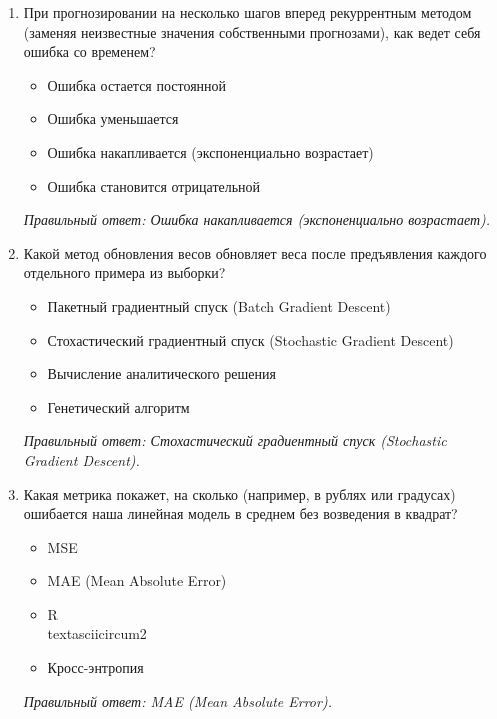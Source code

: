 \begin{enumerate}[label=\textbf{\arabic*.}, leftmargin=0pt, itemsep=1.2em]
\item При прогнозировании на несколько шагов вперед рекуррентным методом (заменяя неизвестные значения собственными прогнозами), как ведет себя ошибка со временем?
\begin{itemize}[label=$\square$, leftmargin=1.5cm, itemsep=0.2em, topsep=0.3em]
\item Ошибка остается постоянной
\item Ошибка уменьшается
\item Ошибка накапливается (экспоненциально возрастает)
\item Ошибка становится отрицательной
\end{itemize}
{\small\textit{Правильный ответ: Ошибка накапливается (экспоненциально возрастает).}}

\item Какой метод обновления весов обновляет веса после предъявления каждого отдельного примера из выборки?
\begin{itemize}[label=$\square$, leftmargin=1.5cm, itemsep=0.2em, topsep=0.3em]
\item Пакетный градиентный спуск (Batch Gradient Descent)
\item Стохастический градиентный спуск (Stochastic Gradient Descent)
\item Вычисление аналитического решения
\item Генетический алгоритм
\end{itemize}
{\small\textit{Правильный ответ: Стохастический градиентный спуск (Stochastic Gradient Descent).}}

\item Какая метрика покажет, на сколько (например, в рублях или градусах) ошибается наша линейная модель в среднем без возведения в квадрат?
\begin{itemize}[label=$\square$, leftmargin=1.5cm, itemsep=0.2em, topsep=0.3em]
\item MSE
\item MAE (Mean Absolute Error)
\item R\\textasciicircum{}2
\item Кросс-энтропия
\end{itemize}
{\small\textit{Правильный ответ: MAE (Mean Absolute Error).}}


\end{enumerate}
